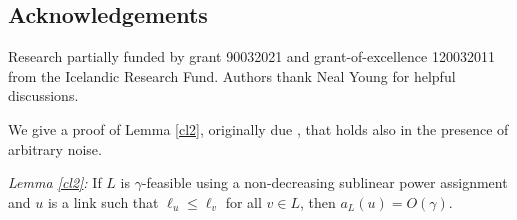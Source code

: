 \documentclass[11pt]{amsart}
\begin{document}
\subsection*{Acknowledgements}
Research partially funded by grant 90032021 and grant-of-excellence 120032011 from the Icelandic Research Fund.
Authors thank Neal Young for helpful discussions.

\vspace*{20pt}



		


\appendix






We give a proof of Lemma \ref{cl2}, originally due \cite{KV10}, that holds
also in the presence of arbitrary noise.

\emph{Lemma \ref{cl2}:}
If $L$ is $\gamma$-feasible using a non-decreasing sublinear power
assignment and  $u$ is a link such that $\ell_u \leq \ell_v$ for all $v \in L$, then $a_{L}(u) = O(\gamma)$.
\smallskip
\end{document}
